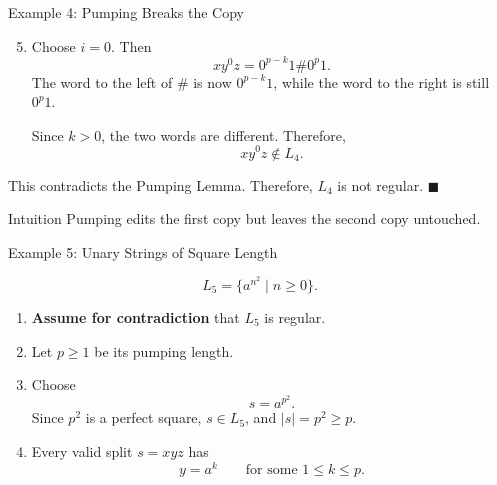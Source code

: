 \documentclass[10pt,aspectratio=169]{beamer}
\begin{document}
\begin{frame}{Example 4: Pumping Breaks the Copy}

\small
\begin{enumerate}
    \setcounter{enumi}{4}
    \item Choose $i=0$. Then
    \[
    xy^0z=0^{p-k}1\#0^p1.
    \]
    The word to the left of $\#$ is now $0^{p-k}1$, while the word to the right is still $0^p1$.

    Since $k>0$, the two words are different. Therefore,
    \[
    xy^0z\notin L_4.
    \]
\end{enumerate}

This contradicts the Pumping Lemma. Therefore, $L_4$ is not regular.
\hfill $\blacksquare$

\vspace{0.7em}
\begin{block}{Intuition}
Pumping edits the first copy but leaves the second copy untouched.
\end{block}

\end{frame}

\begin{frame}{Example 5: Unary Strings of Square Length}

\small
\[
L_5=\{a^{n^2}\mid n\geq 0\}.
\]

\begin{enumerate}
    \item \textbf{Assume for contradiction} that $L_5$ is regular.
    \item Let $p\geq 1$ be its pumping length.
    \item Choose
    \[
    s=a^{p^2}.
    \]
    Since $p^2$ is a perfect square, $s\in L_5$, and $|s|=p^2\geq p$.
    \item Every valid split $s=xyz$ has
    \[
    y=a^k
    \qquad\text{for some }1\leq k\leq p.
    \]
\end{enumerate}

\end{frame}
\end{document}
